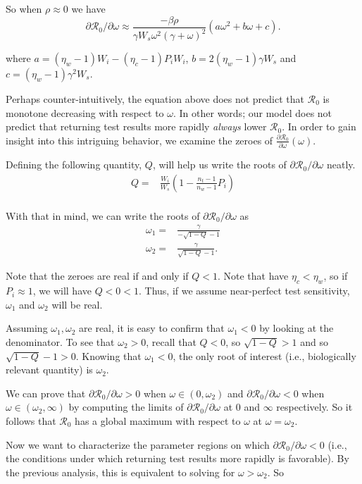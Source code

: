 \documentclass[12pt]{article}
\newcommand{\Rnum}{\mathcal{R}_0}
\theoremstyle{definition} %
\begin{document}
So when $\rho \approx 0$ we have $$\partial{\Rnum}/\partial{\omega} \approx  \frac{-\beta \rho}{\gamma W_s\omega^2 (\gamma+\omega)^2}  (a \omega^2 + b \omega + c).$$

where $a=(\eta_w-1)W_i-(\eta_c-1)P_iW_i$, $b=2(\eta_w-1)\gamma W_s$ and $c=(\eta_w-1)\gamma^2 W_s$. 

Perhaps counter-intuitively, the equation above does not predict that $\Rnum$ is monotone decreasing with respect to $\omega$. In other words; our model does not predict that returning test results more rapidly \textit{always} lower $\Rnum$. In order to gain insight into this intriguing behavior, we examine the zeroes of $\frac{\partial{\Rnum}}{\partial{\omega}}(\omega)$.

Defining the following quantity, $Q$, will help us write the roots of $\partial{\Rnum}/\partial{\omega}$ neatly. 
\begin{align}\label{eq:defQ}
    Q =& \frac{W_i}{W_s}\left(1-\frac{n_{t}-1}{n_{w}-1}P_{i}\right) \\
\end{align}

With that in mind, we can write the roots of $\partial{\Rnum}/\partial{\omega}$ as
\begin{align}
    \omega_1 =& \frac{\gamma}{-\sqrt{1-Q}-1} \\
    \omega_2 =& \frac{\gamma}{\sqrt{1-Q}-1}.
\end{align}

Note that the zeroes are real if and only if $Q < 1$. Note that have $\eta_c < \eta_w$, so if $P_i \approx 1$, we will have $Q < 0 < 1$. Thus, if we assume near-perfect test sensitivity, $\omega_1$ and $\omega_2$ will be real. 

Assuming $\omega_1, \omega_2$ are real, it is easy to confirm that $\omega_1 < 0$ by looking at the denominator. To see that $\omega_2 > 0$, recall that $Q < 0$, so $\sqrt{1-Q} > 1$ and so $\sqrt{1-Q} -1 > 0$. Knowing that $\omega_1 < 0$, the only root of interest (i.e., biologically relevant quantity) is $\omega_2$. 

We can prove that $\partial{\Rnum}/\partial{\omega} > 0$ when $\omega \in (0,\omega_2)$ and $\partial{\Rnum}/\partial{\omega} < 0$ when $\omega \in (\omega_2,\infty)$ by computing the limits of $\partial{\Rnum}/\partial{\omega}$ at $0$ and $\infty$ respectively. So it follows that $\Rnum$ has a global maximum with respect to $\omega$ at $\omega = \omega_2$.

Now we want to characterize the parameter regions on which $\partial{\Rnum}/\partial{\omega} < 0$ (i.e., the conditions under which returning test results more rapidly is favorable). By the previous analysis, this is equivalent to solving for $\omega > \omega_2$. So
\end{document}

